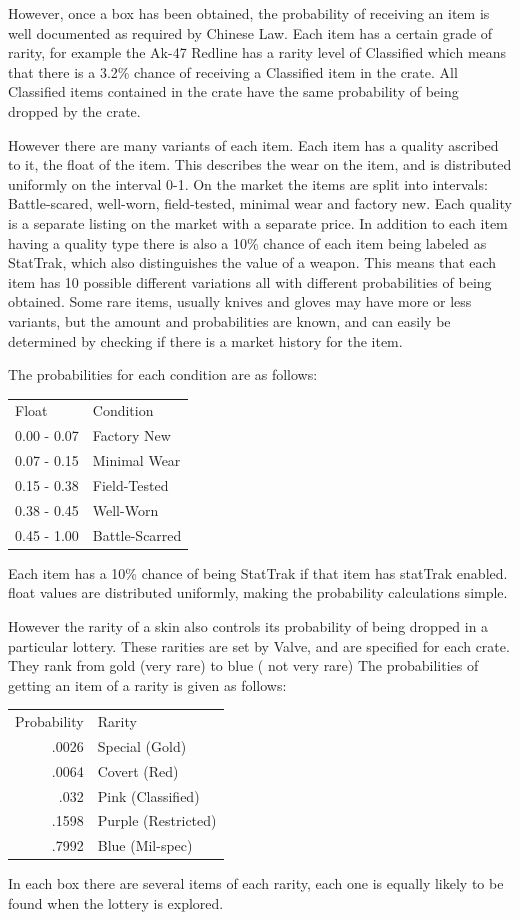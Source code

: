 \documentclass[12pt, letterpaper]{paper}
\begin{document}
However, once a box has been obtained, the probability of receiving an
item is well documented as required by Chinese Law. Each item has a
certain grade of rarity, for example the Ak-47 Redline has a rarity
level of Classified which means that there is a 3.2\% chance of
receiving a Classified item in the crate. All Classified items
contained in the crate have the same probability of being dropped by
the crate.

However there are many variants of each item. Each item has a quality
ascribed to it, the float of the item. This describes the wear on the
item, and is distributed uniformly on the interval 0-1. On the market
the items are split into intervals: Battle-scared, well-worn,
field-tested, minimal wear and factory new. Each quality is a separate
listing on the market with a separate price. In addition to each item
having a quality type there is also a 10\% chance of each item being
labeled as StatTrak, which also distinguishes the value of a
weapon. This means that each item has 10 possible different variations
all with different probabilities of being obtained. Some rare items,
usually knives and gloves may have more or less variants, but the
amount and probabilities are known, and can easily be determined by
checking if there is a market history for the item.

The probabilities for each condition are as follows:
\begin{center}
\begin{tabular}{ll}
Float & Condition\\
0.00 - 0.07 & Factory New\\
0.07 - 0.15 & Minimal Wear\\
0.15 - 0.38 & Field-Tested\\
0.38 - 0.45 & Well-Worn\\
0.45 - 1.00 & Battle-Scarred\\
\end{tabular}
\end{center}
Each item has a 10\% chance of being StatTrak if that item has statTrak
enabled. float values are distributed uniformly, making the
probability calculations simple.

However the rarity of a skin also controls its probability of being
dropped in a particular lottery. These rarities are set by Valve, and
are specified for each crate. They rank from gold (very rare) to blue
( not very rare)
The probabilities of getting an item of a rarity is given as follows:
\begin{center}
\begin{tabular}{rl}
Probability & Rarity\\
.0026 & Special (Gold)\\
.0064 & Covert (Red)\\
.032 & Pink (Classified)\\
.1598 & Purple (Restricted)\\
.7992 & Blue (Mil-spec)\\
\end{tabular}
\end{center}
In each box there are several items of each rarity, each one is
equally likely to be found when the lottery is explored.
\end{document}
